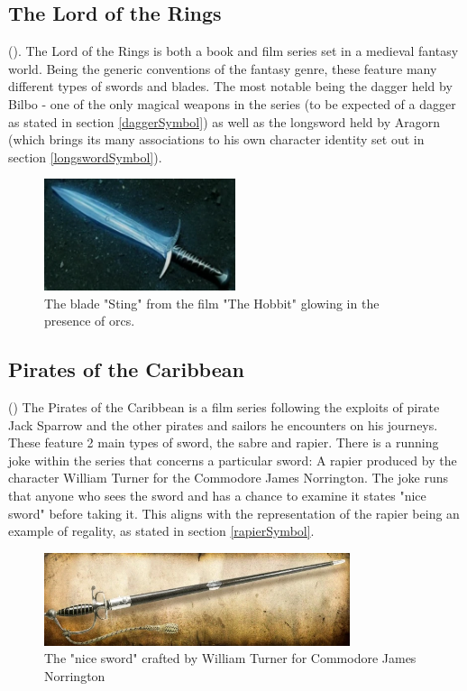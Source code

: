 \documentclass{article}
\begin{document}
\pagebreak

\subsection{The Lord of the Rings}

().
The Lord of the Rings is both a book and film series set in a medieval fantasy world. Being the generic conventions of the fantasy genre, these feature many different types of swords and blades. The most notable being the dagger held by Bilbo - one of the only magical weapons in the series (to be expected of a dagger as stated in section \ref{daggerSymbol}) as well as the longsword held by Aragorn (which brings its many associations to his own character identity set out in section \ref{longswordSymbol}).

\begin{figure}[h]
    \centering
    \caption{\parencite{Sting} The blade "Sting" from the film "The Hobbit" glowing in the presence of orcs.}
    \label{fig:Sting}
    \includegraphics[width=0.5\textwidth]{Sting.png}
\end{figure}

\subsection{Pirates of the Caribbean}

()
The Pirates of the Caribbean is a film series following the exploits of pirate Jack Sparrow and the other pirates and sailors he encounters on his journeys. These feature 2 main types of sword, the sabre and rapier. There is a running joke within the series that concerns a particular sword: A rapier produced by the character William Turner for the Commodore James Norrington. The joke runs that anyone who sees the sword and has a chance to examine it states "nice sword" before taking it. This aligns with the representation of the rapier being an example of regality, as stated in section \ref{rapierSymbol}.

\begin{figure}[h]
    \centering
    \includegraphics[width=0.8\textwidth]{Norringtonssword.png}
    \caption{The "nice sword" crafted by William Turner for Commodore James Norrington}
    \label{fig:potcSword}
\end{figure}
\end{document}
